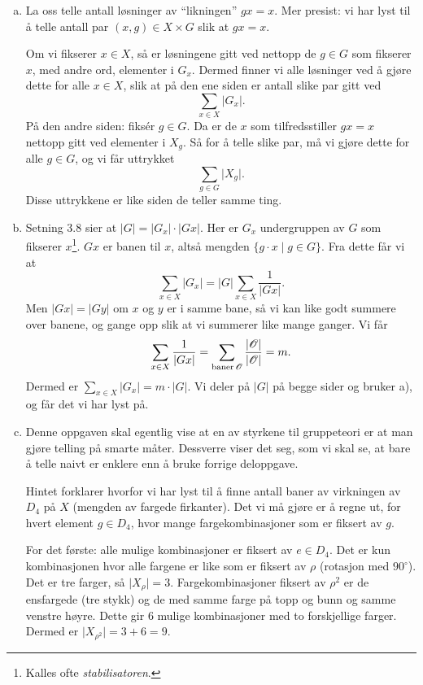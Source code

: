 \documentclass[11pt, norsk]{article}
\begin{document}
\begin{losn}
  \begin{enumerate}[a)]
  \item La oss telle antall løsninger av ``likningen'' $gx=x$. Mer presist: vi har lyst til å telle antall par $(x,g) \in X \times G$ slik at $gx=x$.

Om vi fikserer $x \in X$, så er løsningene gitt ved nettopp de $g \in G$ som fikserer $x$, med andre ord, elementer i $G_x$. Dermed finner vi alle løsninger ved å gjøre dette for alle $x \in X$, slik at på den ene siden er antall slike par gitt ved 
\[
\sum_{x \in X} \lvert G_x \rvert .
\]
På den andre siden: fiksér $g \in G$. Da er de $x$ som tilfredsstiller $gx=x$ nettopp gitt ved elementer i $X_g$. Så for å telle slike par, må vi gjøre dette for alle $g \in G$, og vi får uttrykket
\[
\sum_{g \in G} \lvert X_g \rvert.
\]
Disse uttrykkene er like siden de teller samme ting.

\item Setning 3.8 sier at $\lvert G \rvert = \lvert G_x \rvert \cdot \lvert Gx \rvert$. Her er $G_x$ undergruppen av $G$ som fikserer $x$\footnote{Kalles ofte \emph{stabilisatoren}.}. $Gx$ er banen til $x$, altså mengden $\{ g \cdot x \mid g \in G \}$. Fra dette får vi at 
\[
\sum_{x \in X} \lvert G_x \rvert = \lvert G \rvert \sum_{x \in X} \frac{1}{\lvert Gx \rvert} .
\]
Men $\lvert Gx \rvert= \lvert Gy \rvert$ om $x$ og $y$ er i samme bane, så vi kan like godt summere over banene, og gange opp slik at vi summerer like mange ganger. Vi får
\[
\sum_{x \in X} \frac{1}{\lvert Gx \rvert} = \sum_{\text{baner} \operatorname{\mathscr{O}}} \frac{\lvert \operatorname{\mathscr{O}} \rvert}{\lvert \operatorname{\mathscr{O}} \rvert} = m.
\]
Dermed er $\sum_{x \in X} \lvert G_x \rvert = m \cdot \lvert G \rvert$. Vi deler på $\lvert G \rvert$ på begge sider og bruker a), og får det vi har lyst på.

\item Denne oppgaven skal egentlig vise at en av styrkene til gruppeteori er at man gjøre telling på smarte måter. Dessverre viser det seg, som vi skal se, at bare å telle naivt er enklere enn å bruke forrige deloppgave.

Hintet forklarer hvorfor vi har lyst til å finne antall baner av virkningen av $D_4$ på $X$ (mengden av fargede firkanter). Det vi må gjøre er å regne ut, for hvert element $g \in D_4$, hvor mange fargekombinasjoner som er fiksert av $g$.

For det første: alle mulige kombinasjoner er fiksert av $e \in D_4$. Det er kun kombinasjonen hvor alle fargene er like som er fiksert av $\rho$ (rotasjon med $90^\circ$). Det er tre farger, så $\lvert X_\rho \rvert = 3$. Fargekombinasjoner fiksert av $\rho^2$ er de ensfargede (tre stykk) og de med samme farge på topp og bunn og samme venstre høyre. Dette gir $6$ mulige kombinasjoner med to forskjellige farger. Dermed er $\lvert X_{\rho^2} \rvert = 3+6=9$. 


\end{enumerate}
\end{losn}
\end{document}
